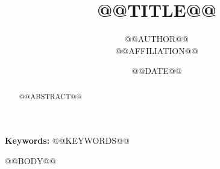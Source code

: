 \documentclass[11pt,a4paper]{article}
\title{@@TITLE@@}
\author{@@AUTHOR@@\\ \small @@AFFILIATION@@}
\date{@@DATE@@}
\begin{document}
\maketitle

\begin{abstract}
@@ABSTRACT@@
\end{abstract}

\medskip
\noindent\textbf{Keywords:} @@KEYWORDS@@

@@BODY@@



\end{document}
